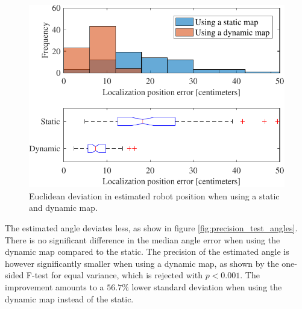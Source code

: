 \begin{figure}
    \centering
    \includegraphics[scale=1]{chapters/evaluation/figures/localization_position_error_distance-crop}
    \caption{Euclidean deviation in estimated robot position when using a static and dynamic map.}
    \label{fig:localization_position_error_distance-crop}
\end{figure}

The estimated angle deviates less, as show in figure \ref{fig:precision_test_angles}. 
There is no significant difference in the median angle error when using the dynamic map compared to the static.
The precision of the estimated angle is however significantly smaller when using a dynamic map, as shown by the one-sided F-test for equal variance, which is rejected with $p<0.001$.
The improvement amounts to a $56.7\%$ lower standard deviation when using the dynamic map instead of the static.

